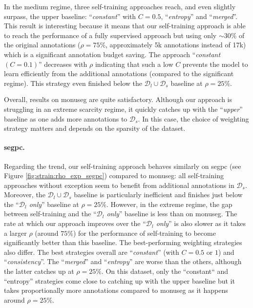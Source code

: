 In the medium regime, three self-training approaches reach, and even slightly surpass, the upper baseline: ``\textit{constant}'' with $C = 0.5$, ``\textit{entropy}'' and ``\textit{merged}''. This result is interesting because it means that our self-training approach is able to reach the performance of a fully supervised approach but using only $\sim 30\%$ of the original annotations (\ie $\rho = 75\%$, approximately 5k annotations instead of 17k) which is a significant annotation budget saving. The approach ``\textit{constant} $(C=0.1)$'' decreases with $\rho$ indicating that such a low $C$ prevents the model to learn efficiently from the additional annotations (compared to the significant regime). This strategy even finished below the $\mathcal{D}_l \cup \mathcal{D}_s$ baseline at $\rho = 25\%$. 

Overall, results on \acrshort{monuseg}  are quite satisfactory. Although our approach is struggling in an extreme scarcity regime, it quickly catches up with the ``\textit{upper}'' baseline as one adds more annotations to $\mathcal{D}_s$. In this case, the choice of weighting strategy matters and depends on the sparsity of the dataset.

\paragraph{\acrshort{segpc}.} Regarding the trend, our self-training approach behaves similarly on \acrshort{segpc} (see Figure \ref{fig:strain:rho_exp_segpc}) compared to \acrshort{monuseg}: all self-training approaches without exception seem to benefit from additional annotations in $\mathcal{D}_s$. Moreover, the $\mathcal{D}_l \cup \mathcal{D}_s$ baseline is particularly inefficient and finishes just below the ``\textit{$\mathcal{D}_l$ only}'' baseline at $\rho = 25\%$. However, in the extreme regime, the gap between self-training and the ``\textit{$\mathcal{D}_l$ only}'' baseline is less than on \acrshort{monuseg}. The rate at which our approach improves over the ``\textit{$\mathcal{D}_l$ only}'' is also slower as it takes a larger $\rho$ (around $75\%$) for the performance of self-training to become significantly better than this baseline. The best-performing weighting strategies also differ. The best strategies overall are ``\textit{constant}'' (with $C = 0.5$ or $1$) and ``\textit{consistency}''. The ``\textit{merged}'' and ``\textit{entropy}'' are worse than the others, although the latter catches up at $\rho = 25\%$. On this dataset, only the ``constant`` and ``entropy'' strategies come close to catching up with the upper baseline but it takes proportionally more annotations compared to \acrshort{monuseg} as it happens around $\rho = 25\%$.

